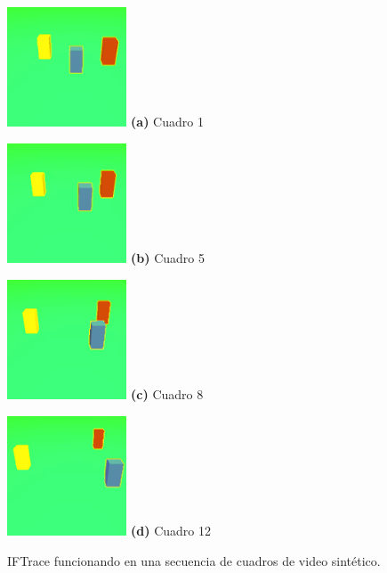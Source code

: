 \begin{figure}[H]
    \centering
    \begin{minipage}[t]{.25\textwidth}
      \includegraphics[width=1.4in]{./images/cropped_happy_occluded_00001.png}
      \centering
      \footnotesize
      \textbf{(a)} Cuadro 1
    \end{minipage}
    \hspace{-0.3cm}
    \begin{minipage}[t]{.25\textwidth}
      \includegraphics[width=1.4in]{./images/cropped_happy_occluded_00005.png}
      \centering
      \footnotesize
      \textbf{(b)} Cuadro 5
    \end{minipage}
    \hspace{-0.3cm}
    \begin{minipage}[t]{.25\textwidth}
      \includegraphics[width=1.4in]{./images/cropped_happy_occluded_00008.png}
      \centering
      \footnotesize
      \textbf{(c)} Cuadro 8
    \end{minipage}
    \hspace{-0.3cm}
    \begin{minipage}[t]{.25\textwidth}
      \includegraphics[width=1.4in]{./images/cropped_happy_occluded_00012.png}
      \centering
      \footnotesize
      \textbf{(d)} Cuadro 12
    \end{minipage}
    \caption{IFTrace funcionando en una secuencia de cuadros de video sintético.
    \label{fig:happy-occluded-iftrace}
    }
\end{figure}

